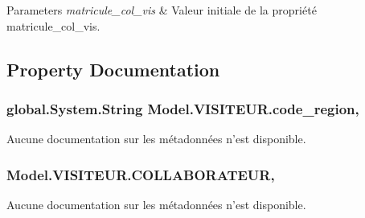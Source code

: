 \begin{DoxyParams}{Parameters}
{\em matricule\-\_\-col\-\_\-vis} & Valeur initiale de la propriété matricule\-\_\-col\-\_\-vis.\\
\hline
\end{DoxyParams}


\subsection{Property Documentation}
\hypertarget{class_model_1_1_v_i_s_i_t_e_u_r_ac9237709a2b9919c19430af4c307d647}{
\subsubsection[{code\-\_\-region}]{\setlength{\rightskip}{0pt plus 5cm}global.\-System.\-String Model.\-V\-I\-S\-I\-T\-E\-U\-R.\-code\-\_\-region\hspace{0.3cm}{\ttfamily [get]}, {\ttfamily [set]}}}\label{class_model_1_1_v_i_s_i_t_e_u_r_ac9237709a2b9919c19430af4c307d647}


Aucune documentation sur les métadonnées n'est disponible. 

\hypertarget{class_model_1_1_v_i_s_i_t_e_u_r_adc7d97aca9f5c1f8438ac6921d6e199f}{
\subsubsection[{C\-O\-L\-L\-A\-B\-O\-R\-A\-T\-E\-U\-R}]{ Model.\-V\-I\-S\-I\-T\-E\-U\-R.\-C\-O\-L\-L\-A\-B\-O\-R\-A\-T\-E\-U\-R\hspace{0.3cm}{\ttfamily [get]}, {\ttfamily [set]}}}\label{class_model_1_1_v_i_s_i_t_e_u_r_adc7d97aca9f5c1f8438ac6921d6e199f}


Aucune documentation sur les métadonnées n'est disponible. 

